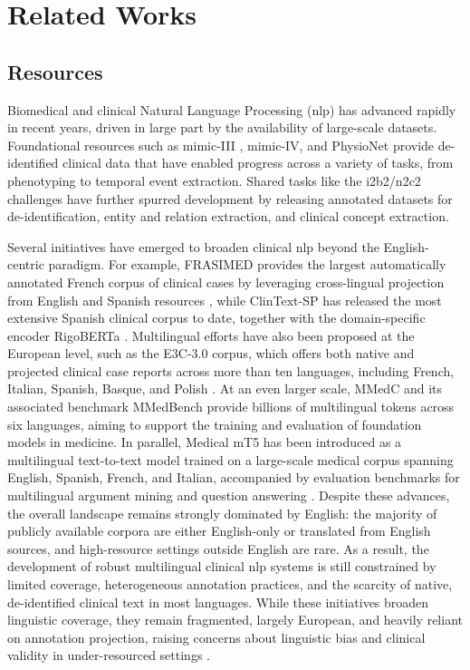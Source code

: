 \chapter{Related Works}
\label{chap:related}
\minitoc
\section{Resources}
\label{sec:resources}
Biomedical and clinical Natural Language Processing (\gls{nlp}) has advanced rapidly in recent years, driven in large part by the availability of large-scale datasets. Foundational resources such as \gls{mimic}-III \citep{Johnson2016MIMIC-IIIDatabase}, \gls{mimic}-IV, and PhysioNet \citep{goldbergerPhysioBankPhysioToolkitPhysioNet2000} provide de-identified clinical data that have enabled progress across a variety of tasks, from phenotyping to temporal event extraction. Shared tasks like the i2b2/n2c2 challenges \citep{uzunerPracticalApplicationsNatural2015} have further spurred development by releasing annotated datasets for de-identification, entity and relation extraction, and clinical concept extraction.

 Several initiatives have emerged to broaden clinical \gls{nlp} beyond the English-centric paradigm. For example, FRASIMED provides the largest automatically annotated French corpus of clinical cases by leveraging cross-lingual projection from English and Spanish resources \citep{zaghir2024frasimed}, while ClinText-SP has released the most extensive Spanish clinical corpus to date, together with the domain-specific encoder RigoBERTa \citep{subiesClinTextSPRigoBERTaClinical2025}. Multilingual efforts have also been proposed at the European level, such as the E3C-3.0 corpus, which offers both native and projected clinical case reports across more than ten languages, including French, Italian, Spanish, Basque, and Polish \citep{ghosh2025e3c}. At an even larger scale, MMedC and its associated benchmark MMedBench \citep{qiu2024building} provide billions of multilingual tokens across six languages, aiming to support the training and evaluation of foundation models in medicine. In parallel, Medical mT5 has been introduced as a multilingual text-to-text model trained on a large-scale medical corpus spanning English, Spanish, French, and Italian, accompanied by evaluation benchmarks for multilingual argument mining and question answering \citep{garciaferrero2024medicalmt5}. Despite these advances, the overall landscape remains strongly dominated by English: the majority of publicly available corpora are either English-only or translated from English sources, and high-resource settings outside English are rare. As a result, the development of robust multilingual clinical \gls{nlp} systems is still constrained by limited coverage, heterogeneous annotation practices, and the scarcity of native, de-identified clinical text in most languages. While these initiatives broaden linguistic coverage, they remain fragmented, largely European, and heavily reliant on annotation projection, raising concerns about linguistic bias and clinical validity in under-resourced settings \citep{villena2025nlp}.

